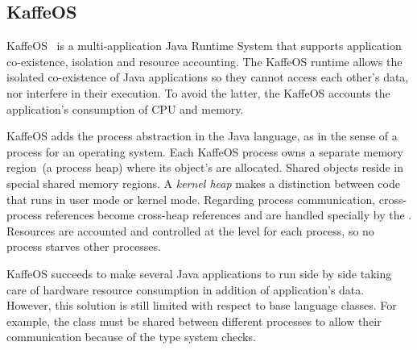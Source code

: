 
\subsection*{KaffeOS}

KaffeOS~\cite{Back00a} is a multi-application Java Runtime System that supports application co-existence, isolation and resource accounting. The KaffeOS runtime allows the isolated co-existence of Java applications so they cannot access each other's data, nor interfere in their execution. To avoid the latter, the KaffeOS \VM accounts the application's consumption of CPU and memory.

KaffeOS adds the process abstraction in the Java language, as in the sense of a process for an operating system. Each KaffeOS process owns a separate memory region~(a process heap) where its object's are allocated. Shared objects reside in special shared memory regions. A \emph{kernel heap} makes a distinction between code that runs in user mode or kernel mode. Regarding process communication, cross-process references become cross-heap references and are handled specially by the \VM. Resources are accounted and controlled at the \VM level for each process, so no process starves other processes.

KaffeOS succeeds to make several Java applications to run side by side taking care of hardware resource consumption in addition of application's data. However, this solution is still limited with respect to base language classes. For example, the class  must be shared between different processes to allow their communication because of the type system checks.

